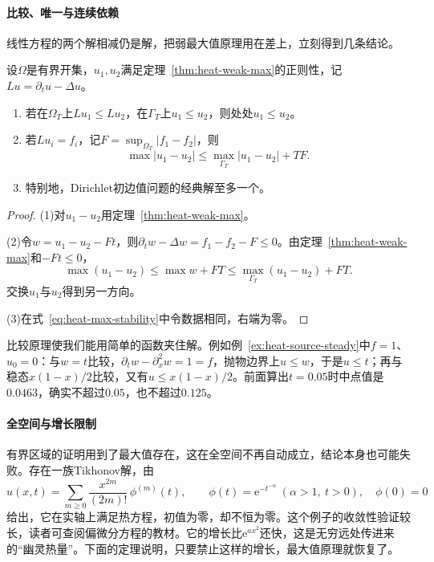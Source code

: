 \paragraph{比较、唯一与连续依赖}
线性方程的两个解相减仍是解，把弱最大值原理用在差上，立刻得到几条结论。

\begin{theorem}[比较原理与唯一性]
\label{thm:heat-comparison}
设$\Omega$是有界开集，$u_1,u_2$满足定理~\ref{thm:heat-weak-max}的正则性，记$Lu=\partial_tu-\Delta u$。
\begin{enumerate}
 \item 若在$\Omega_T$上$Lu_1\leq Lu_2$，在$\Gamma_T$上$u_1\leq u_2$，则处处$u_1\leq u_2$。
 \item 若$Lu_i=f_i$，记$F=\sup_{\Omega_T}\lvert f_1-f_2\rvert$，则
 \begin{equation}
  \max\lvert u_1-u_2\rvert\leq\max_{\Gamma_T}\lvert u_1-u_2\rvert+TF .
  \label{eq:heat-max-stability}
 \end{equation}
 \item 特别地，Dirichlet初边值问题的经典解至多一个。
\end{enumerate}
\end{theorem}

\begin{proof}
(1)对$u_1-u_2$用定理~\ref{thm:heat-weak-max}。

(2)令$w=u_1-u_2-Ft$，则$\partial_tw-\Delta w=f_1-f_2-F\leq0$。由定理~\ref{thm:heat-weak-max}和$-Ft\leq0$，
\[
 \max(u_1-u_2)\leq\max w+FT\leq\max_{\Gamma_T}(u_1-u_2)+FT .
\]
交换$u_1$与$u_2$得到另一方向。

(3)在式~\eqref{eq:heat-max-stability}中令数据相同，右端为零。
\end{proof}

比较原理使我们能用简单的函数夹住解。例如例~\ref{ex:heat-source-steady}中$f=1$、$u_0=0$：与$w=t$比较，$\partial_tw-\partial_x^2w=1=f$，抛物边界上$u\leq w$，于是$u\leq t$；再与稳态$x(1-x)/2$比较，又有$u\leq x(1-x)/2$。前面算出$t=0.05$时中点值是$0.0463$，确实不超过$0.05$，也不超过$0.125$。

\paragraph{全空间与增长限制}
有界区域的证明用到了最大值存在，这在全空间不再自动成立，结论本身也可能失败。存在一族Tikhonov解，由
\[
 u(x,t)=\sum_{m\geq0}\frac{x^{2m}}{(2m)!}\,\phi^{(m)}(t),\qquad \phi(t)=\mathrm{e}^{-t^{-\alpha}}\ (\alpha>1,\ t>0),\quad \phi(0)=0
\]
给出，它在实轴上满足热方程，初值为零，却不恒为零。这个例子的收敛性验证较长，读者可查阅偏微分方程的教材。它的增长比$\mathrm{e}^{ax^2}$还快，这是无穷远处传进来的“幽灵热量”。下面的定理说明，只要禁止这样的增长，最大值原理就恢复了。

